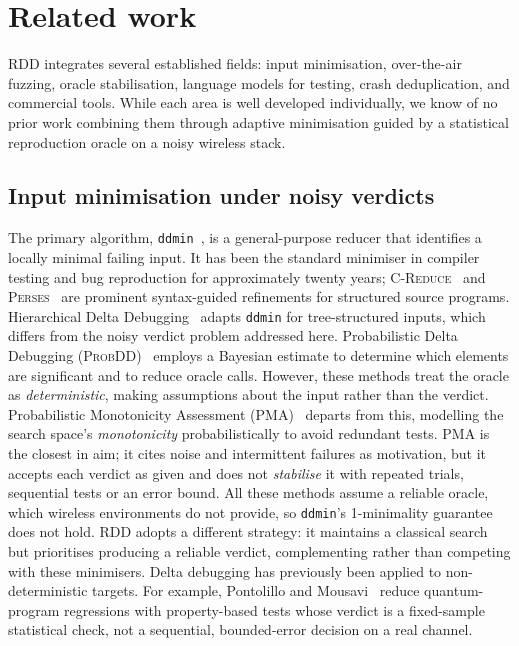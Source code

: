 \section{Related work}\label{sec:related_work}

RDD integrates several established fields: input minimisation, over-the-air
fuzzing, oracle stabilisation, language models for testing, crash deduplication,
and commercial tools. While each area is well developed individually, we know of no
prior work combining them through adaptive minimisation guided by a statistical
reproduction oracle on a noisy wireless stack.

\subsection{Input minimisation under noisy verdicts}

The primary algorithm, \texttt{ddmin}~\cite{ddmin2002}, is a general-purpose
reducer that identifies a locally minimal failing input. It has been the standard
minimiser in compiler testing and bug reproduction for approximately twenty years;
\textsc{C-Reduce}~\cite{creduce2012} and \textsc{Perses}~\cite{perses2018} are
prominent syntax-guided refinements for structured source programs.
Hierarchical Delta Debugging~\cite{hdd2006} adapts \texttt{ddmin} for
tree-structured inputs, which differs from the noisy verdict problem addressed
here. Probabilistic Delta Debugging (\textsc{ProbDD})~\cite{probdd2021} employs a
Bayesian estimate to determine which elements are significant and to reduce oracle
calls. However, these methods treat the oracle as \emph{deterministic}, making
assumptions about the input rather than the verdict. Probabilistic Monotonicity
Assessment (\textsc{PMA})~\cite{pma2025} departs from this,
modelling the search space's \emph{monotonicity} probabilistically to avoid
redundant tests. \textsc{PMA} is the closest in aim; it cites noise and
intermittent failures as motivation, but it accepts each verdict as given and does
not \emph{stabilise} it with repeated trials, sequential tests or an error bound. All these methods assume a
reliable oracle, which wireless environments do not provide, so \texttt{ddmin}'s
1-minimality guarantee does not hold. RDD adopts a different strategy: it maintains
a classical search but prioritises producing a reliable verdict, complementing
rather than competing with these minimisers. Delta debugging has previously been
applied to non-deterministic targets. For example, Pontolillo and
Mousavi~\cite{quantumdd2024} reduce quantum-program regressions with
property-based tests whose verdict is a fixed-sample statistical check, not a
sequential, bounded-error decision on a real channel.


